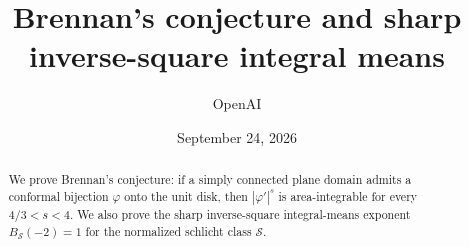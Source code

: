 \documentclass[11pt]{article}
\title{Brennan's conjecture and sharp inverse-square integral means}
\author{OpenAI}
\date{September 24, 2026}
\newcommand{\SSS}{\mathcal S}
\theoremstyle{definition}
\theoremstyle{remark}
\numberwithin{equation}{section}
\begin{document}
\maketitle
\begin{abstract}
We prove Brennan's conjecture: if a simply connected plane domain admits a
conformal bijection $\varphi$ onto the unit disk, then $|\varphi'|^s$ is
area-integrable for every $4/3<s<4$. We also prove the sharp inverse-square
integral-means exponent $B_{\SSS}(-2)=1$ for the normalized schlicht class
$\SSS$.
\end{abstract}
\tableofcontents









\end{document}
